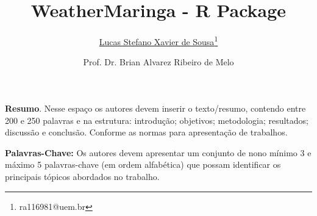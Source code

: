 \documentclass{ceel}
\title{WeatherMaringa - R Package}
\author[1]{\underline{Lucas Stefano Xavier de Sousa}\thanks{ ra116981@uem.br }}
\author[1]{Prof. Dr. Brian Alvarez Ribeiro de Melo}
\affil[1]{DES - Universidade Estadual de Maringá}
\begin{document}
	
\inserirtitulo
			
		
		\textbf{Resumo}. Nesse espaço os autores devem inserir o texto/resumo, contendo entre 200 e 250 palavras e na estrutura: introdução; objetivos; metodologia; resultados; discussão e conclusão. 
		Conforme as normas  para apresentação de trabalhos.
		
		\bigskip
		\textbf{Palavras-Chave:} Os autores devem apresentar um conjunto de nono mínimo 3 e máximo 5 palavras-chave (em ordem alfabética) que possam identificar os principais tópicos abordados no trabalho.
				
\end{document}
